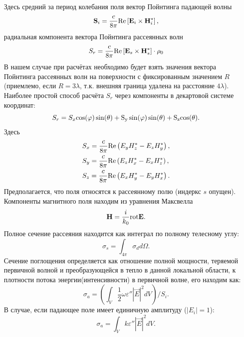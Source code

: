 Здесь средний за период колебания поля вектор Пойнтинга падающей волны
\begin{equation}
{\vec S}_i = \dfrac{c}{8\pi} {\rm Re} \left[{\vec E}_i \times {\vec H}^*_i\right],
\end{equation}
радиальная компонента вектора Пойнтинга рассеянных волн
\begin{equation}
{S}_r = \dfrac{c}{8\pi} {\rm Re} \left[{\vec E}_s \times {\vec H}^*_s\right] \cdot {\vec \rho}_0
\end{equation}
В нашем случае при расчётах необходимо будет взять значения вектора Пойнтинга рассеянных волн на поверхности с фиксированным значением $R$ (приемлемо, если $R=3\lambda$, т.к. внешняя граница удалена на расстояние $4\lambda$).\\
Наиболее простой способ расчёта $S_r$ через компоненты в декартовой системе координат:
\begin{equation}
{S}_r = S_x \rm cos(\varphi)\sin(\theta) + S_y \sin(\varphi)\sin(\theta) + S_z \rm cos(\theta).
\end{equation}
Здесь
\begin{eqnarray}
& S_x = \dfrac{c}{8\pi} {\rm Re} \left(E_y H_z^* - E_z H_y^*\right),\nonumber\\
& S_y = \dfrac{c}{8\pi} {\rm Re} \left(E_z H_x^* - E_x H_z^*\right),\nonumber\\ & S_z = \dfrac{c}{8\pi} {\rm Re} \left(E_x H_y^* - E_y H_x^*\right).
\end{eqnarray}
Предполагается, что поля относятся к рассеянному полю (индеркс $s$ опущен).
Компоненты магнитного поля находим из уравнения Максвелла
\begin{equation}
{\vec H} = \dfrac{i}{k_0} {\rm \rm rot} \vec{E}.
\end{equation}
Полное сечение рассеяния находится как интеграл по полному телесному углу:
\begin{equation}
\sigma_s = \int_{4\pi} \sigma_d d\Omega.
\end{equation}
Сечение поглощения определяется как отношение полной мощности, теряемой первичной волной и преобразующейся в тепло в данной локальной области, к плотности потока энергии(интенсивности) в первичной волне, его находим как:
\begin{equation}
\sigma_a = \left(\int_V \dfrac{1}{2}\omega\varepsilon''|{\vec E}|^2 d V\right)/S_i.
\end{equation}
В случае, если падающее поле имеет единичную амплитуду ($|E_i|=1$):
\begin{equation}
\sigma_a = \int_V k \varepsilon''|{\vec E}|^2 d V.
\end{equation}

